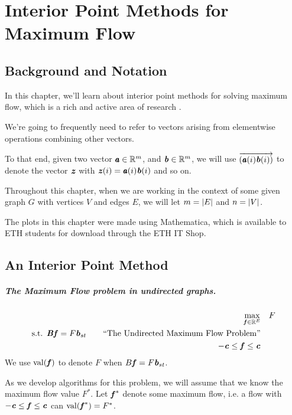 \chapter{Interior Point Methods for Maximum Flow}

\newcommand{\sdiv}{\tilde{D}}
\newcommand\cvec[1]{\overrightarrow{\left(#1\right)}}

\section*{Background and Notation}

In this chapter, we'll learn about interior point methods for solving
maximum flow, which is a rich and active area of research \cite{DS08,M13,LS20a,LS20b}. 

We're going to frequently need to refer to vectors
arising from elementwise operations combining other vectors.

To that end, given two vector $\pmb{\mathit{a}} \in \mathbb{R}^m$, and $\boldsymbol{\mathit{b}} \in \mathbb{R}^m$, we
will use $\cvec{\aa(i) \bb(i)}$ to denote the vector $\boldsymbol{\mathit{z}}$ with
$\boldsymbol{\mathit{z}}(i) = \pmb{\mathit{a}}(i) \boldsymbol{\mathit{b}}(i)$ and so on.

Throughout this chapter, when we are working in the context of some
given graph $G$ with vertices $V$ and edges $E$, we will let $m =
\left|E \right|$ and $n = \left|V \right|$.

The plots in this chapter were made using Mathematica, which is
available to ETH students for download through the ETH IT Shop.


\section{An Interior Point Method}
\paragraph{The Maximum Flow problem in undirected graphs.}
 \begin{align}
   \label{eq:maxflow}
\max_{\boldsymbol{\mathit{f}} \in \mathbb{R}^E}  & \quad F    \\
   \textrm{s.t. }  \boldsymbol{\mathit{B}}\boldsymbol{\mathit{f}}= F \boldsymbol{\mathit{b}}_{st}
     \tag*{``The Undirected Maximum Flow Problem''}
   \\
   \nonumber 
   -\boldsymbol{\mathit{c}} \leq \boldsymbol{\mathit{f}} \leq \boldsymbol{\mathit{c}}
\end{align}
We use $\operatorname*{val}(\boldsymbol{\mathit{f}})$ to denote $F$ when $B\boldsymbol{\mathit{f}} = F\boldsymbol{\mathit{b}}_{st}$.

As we develop algorithms for this problem, we will assume that we know
the maximum flow value $F^*$.
Let $\boldsymbol{\mathit{f}}^*$ denote some maximum flow, i.e. a flow with $-\boldsymbol{\mathit{c}} \leq \boldsymbol{\mathit{f}}
\leq \boldsymbol{\mathit{c}}$ can $\operatorname*{val}(\boldsymbol{\mathit{f}}^*) = F^*$.

